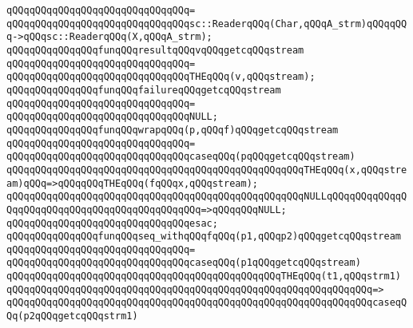 \verb|qQQqqQQqqQQqqQQqqQQqqQQqqQQqqQQq=|\newline
\verb|qQQqqQQqqQQqqQQqqQQqqQQqqQQqqQQqsc::ReaderqQQq(Char,qQQqA_strm)qQQqqQQq->qQQqsc::ReaderqQQq(X,qQQqA_strm);|\newline
\newline
\newline
\verb|qQQqqQQqqQQqqQQqfunqQQqresultqQQqvqQQqgetcqQQqstream|\newline
\verb|qQQqqQQqqQQqqQQqqQQqqQQqqQQqqQQq=|\newline
\verb|qQQqqQQqqQQqqQQqqQQqqQQqqQQqqQQqTHEqQQq(v,qQQqstream);|\newline
\newline
\newline
\verb|qQQqqQQqqQQqqQQqfunqQQqfailureqQQqgetcqQQqstream|\newline
\verb|qQQqqQQqqQQqqQQqqQQqqQQqqQQqqQQq=|\newline
\verb|qQQqqQQqqQQqqQQqqQQqqQQqqQQqqQQqNULL;|\newline
\newline
\verb|qQQqqQQqqQQqqQQqfunqQQqwrapqQQq(p,qQQqf)qQQqgetcqQQqstream|\newline
\verb|qQQqqQQqqQQqqQQqqQQqqQQqqQQqqQQq=|\newline
\verb|qQQqqQQqqQQqqQQqqQQqqQQqqQQqqQQqcaseqQQq(pqQQqgetcqQQqstream)|\newline
\verb|qQQqqQQqqQQqqQQqqQQqqQQqqQQqqQQqqQQqqQQqqQQqqQQqqQQqTHEqQQq(x,qQQqstream)qQQq=>qQQqqQQqTHEqQQq(fqQQqx,qQQqstream);|\newline
\verb|qQQqqQQqqQQqqQQqqQQqqQQqqQQqqQQqqQQqqQQqqQQqqQQqqQQqNULLqQQqqQQqqQQqqQQqqQQqqQQqqQQqqQQqqQQqqQQqqQQqqQQq=>qQQqqQQqNULL;|\newline
\verb|qQQqqQQqqQQqqQQqqQQqqQQqqQQqqQQqesac;|\newline
\newline
\newline
\verb|qQQqqQQqqQQqqQQqfunqQQqseq_withqQQqfqQQq(p1,qQQqp2)qQQqgetcqQQqstream|\newline
\verb|qQQqqQQqqQQqqQQqqQQqqQQqqQQqqQQq=|\newline
\verb|qQQqqQQqqQQqqQQqqQQqqQQqqQQqqQQqcaseqQQq(p1qQQqgetcqQQqstream)|\newline
\newline
\verb|qQQqqQQqqQQqqQQqqQQqqQQqqQQqqQQqqQQqqQQqqQQqqQQqTHEqQQq(t1,qQQqstrm1)|\newline
\verb|qQQqqQQqqQQqqQQqqQQqqQQqqQQqqQQqqQQqqQQqqQQqqQQqqQQqqQQqqQQqqQQq=>|\newline
\verb|qQQqqQQqqQQqqQQqqQQqqQQqqQQqqQQqqQQqqQQqqQQqqQQqqQQqqQQqqQQqqQQqcaseqQQq(p2qQQqgetcqQQqstrm1)|\newline
